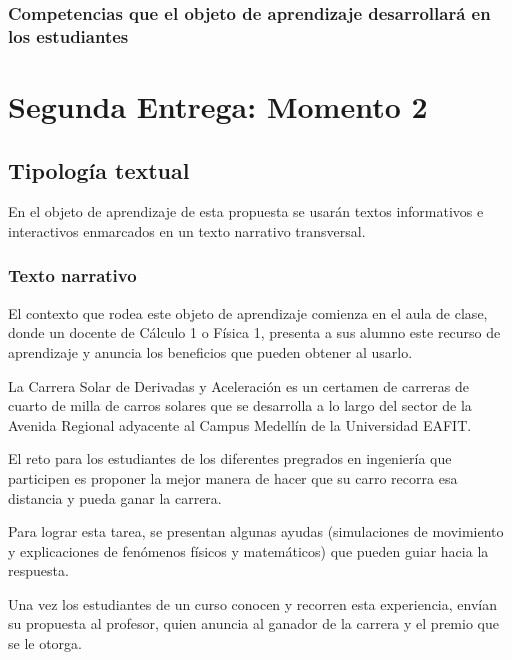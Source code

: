 \documentclass[twoside,letterpaper,12pt]{report}
\begin{document}

\subsection{Competencias que el objeto de aprendizaje desarrollará en los estudiantes } %




\chapter{Segunda Entrega: Momento 2}

\section{Tipología textual}

En el objeto de aprendizaje de esta propuesta se usarán textos informativos e interactivos enmarcados en un texto narrativo transversal.

\subsection{Texto narrativo} %
\label{sub:texto_narrativo}

El contexto que rodea este objeto de aprendizaje comienza en el aula de clase, donde un docente de Cálculo 1 o Física 1, presenta a sus alumno este recurso de aprendizaje y anuncia los beneficios que pueden obtener al usarlo.

La Carrera Solar de Derivadas y Aceleración es un certamen de carreras de cuarto de milla de carros solares que se desarrolla a lo largo del sector de la Avenida Regional adyacente al Campus Medellín de la Universidad EAFIT.

El reto para los estudiantes de los diferentes pregrados en ingeniería que participen es proponer la mejor manera de hacer que su carro recorra esa distancia y pueda ganar la carrera.

Para lograr esta tarea, se presentan algunas ayudas (simulaciones de movimiento y explicaciones de fenómenos físicos y matemáticos) que pueden guiar hacia la respuesta.

Una vez los estudiantes de un curso conocen y recorren esta experiencia, envían su propuesta al profesor, quien anuncia al ganador de la carrera y el premio que se le otorga.
\end{document}
